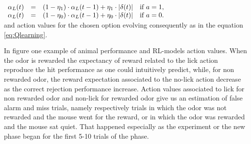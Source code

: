 \begin{description}
   $\begin{array}{lcll}
    \alpha_{L}(t) & = & (1-\eta_1)\cdot\alpha_{L}(t-1)+\eta_1\cdot\left\lvert\delta(t)\right\rvert & \mbox{if\,\,}  a=1,\\
    \alpha_{L}(t) & = & (1-\eta_0)\cdot\alpha_{L}(t-1)+\eta_0\cdot\left\lvert\delta(t)\right\rvert & \mbox{if\,\,}  a=0.\\
    \end{array}$\\
    and action values for the chosen option evolving consequently as in the equation \ref{eq:Qlearning}.
\end{description}
In figure one example of animal performance and RL-models action
values. When the odor is rewarded the expectancy of reward related to the lick
action reproduce the hit performance as one could intuitively predict, while, for non
rewarded odor, the reward expectation associated to the no-lick action decrease as
the correct rejection performance increase. Action values associated to lick for non
rewarded odor and non-lick for rewarded odor give us an estimation of false alarm
and miss trials, namely respectively trials in which the odor was not rewarded and
the mouse went for the reward, or in which the odor was rewarded and the mouse
sat quiet. That happened especially as the experiment or the new phase began for
the first 5-10 trials of the phase.

